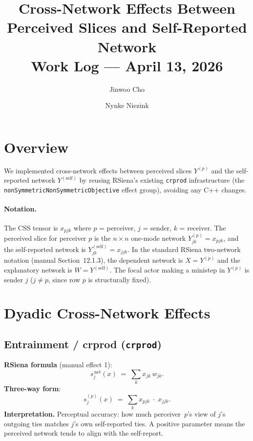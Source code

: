 \documentclass[11pt]{article}
\title{Cross-Network Effects Between Perceived Slices and Self-Reported Network\\[4pt]
\large Work Log --- April 13, 2026}
\author{Jinwoo Cho \and Nynke Niezink}
\date{}
\newcommand{\self}{\mathrm{self}}
\begin{document}
\maketitle

\section{Overview}

We implemented cross-network effects between perceived slices $Y^{(p)}$ and
the self-reported network $Y^{(\self)}$ by reusing RSiena's existing
\texttt{crprod} infrastructure (the \texttt{nonSymmetricNonSymmetricObjective}
effect group), avoiding any C++ changes.

\paragraph{Notation.}
The CSS tensor is $x_{pjk}$ where $p$ = perceiver, $j$ = sender, $k$ = receiver.
The perceived slice for perceiver $p$ is the $n \times n$ one-mode network
$Y^{(p)}_{jk} = x_{pjk}$, and the self-reported network is
$Y^{(\self)}_{jk} = x_{jjk}$.
In the standard RSiena two-network notation (manual Section~12.1.3),
the dependent network is $X = Y^{(p)}$ and the explanatory network is
$W = Y^{(\self)}$.
The focal actor making a ministep in $Y^{(p)}$ is sender $j$ ($j \neq p$,
since row $p$ is structurally fixed).

\section{Dyadic Cross-Network Effects}

\subsection{Entrainment / crprod (\texttt{crprod})}

\textbf{RSiena formula} (manual effect 1):
\[
  s_{j}^{\,\mathrm{net}}(x) \;=\; \sum_{k} x_{jk}\, w_{jk}.
\]
\textbf{Three-way form}:
\[
  s_{j}^{(p)}(x) \;=\; \sum_{k} x_{pjk} \;\cdot\; x_{jjk}.
\]
\textbf{Interpretation.}
Perceptual accuracy: how much perceiver~$p$'s view of $j$'s outgoing ties
matches $j$'s own self-reported ties.
A positive parameter means the perceived network tends to align with
the self-report.
\end{document}
